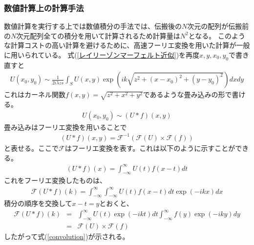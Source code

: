 \documentclass[a4paper,11pt,uplatex]{jsbook}
\begin{document}
\subsubsection{数値計算上の計算手法}
数値計算を実行する上では数値積分の手法では、伝搬後の$N$次元の配列が伝搬前の$N$次元配列全ての積分を用いて計算されるため計算量は$N^2$となる。
このような計算コストの高い計算を避けるために、高速フーリエ変換を用いた計算が一般に用いられている。
式(\ref{レイリーゾンマーフェルト近似})を再度$x,y,x_0,y_0$で書き直すと
\begin{eqnarray}
  U(x_0,y_0) \sim \frac{1}{2i\lambda zs}\int_S U(x,y) \exp( ik \sqrt{z^2 + (x-x_0)^2 + (y-y_0)^2}) dxdy
\end{eqnarray}
これはカーネル関数$f(x,y) = \sqrt{z^2 +x^2 + y^2}$であるような畳み込みの形で書ける。
\begin{eqnarray}
  U(x_0,y_0) \sim (U * f)(x,y)
\end{eqnarray}
畳み込みはフーリエ変換を用いることで
\begin{eqnarray}
  (U*f)(x,y) = \mathcal{F}^{-1}(\mathcal{F}(U) \times \mathcal{F}(f)) \label{convolution}
\end{eqnarray}
と表せる。ここで$\mathcal{F}$はフーリエ変換を表す。これは以下のように示すことができる。
\begin{eqnarray}
  (U*f)(x) = \int_{-\infty}^{\infty} U(t)f(x-t)dt
\end{eqnarray}
これをフーリエ変換したものは、
\begin{eqnarray}
  \mathcal{F}(U*f)(k) = \int_{-\infty}^{\infty} \int_{-\infty}^{\infty} U(t)f(x-t)dt \exp(-ikx)dx
\end{eqnarray}
積分の順序を交換して$x-t = y$とおくと、
\begin{eqnarray}
  \mathcal{F}(U*f)(k) &=& \int_{-\infty}^{\infty} U(t) \exp(-ikt)dt \int_{-\infty}^{\infty} f(y) \exp(-iky)dy\\
  &=& \mathcal{F}(U) \times \mathcal{F}(f)
\end{eqnarray}
したがって式(\ref{convolution})が示される。
\end{document}
